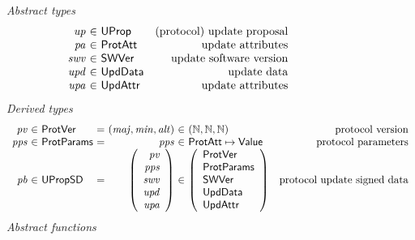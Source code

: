 \begin{figure}[htb]
  \emph{Abstract types}
  \begin{equation*}
    \begin{array}{r@{~\in~}lr}
      \var{up} & \UProp & \text{(protocol) update proposal}\\
      \var{pa} & \ProtAtt & \text{update attributes}\\
      \var{swv} & \type{SWVer} & \text{update software version}\\
      \var{upd} & \type{UpdData} & \text{update data}\\
      \var{upa} & \type{UpdAttr} & \text{update attributes}\\
    \end{array}
  \end{equation*}
  \emph{Derived types}
  \begin{equation*}
    \begin{array}{r@{~\in~}l@{~=~}r@{~\in~}lr}
      \var{pv} & \ProtVer & (\var{maj}, \var{min}, \var{alt})
      & (\mathbb{N}, \mathbb{N}, \mathbb{N}) & \text{protocol version}\\
      \var{pps} & \ProtParams & \var{pps} & \ProtAtt \mapsto \Value
                                             & \text{protocol parameters}\\
      \var{pb} & \UPropSD
      &
        {\left(\begin{array}{r l}
                 \var{pv}\\
                 \var{pps}\\
                 \var{swv}\\
                 \var{upd}\\
                 \var{upa}\\
               \end{array}\right)}
      & {
        \left(
        \begin{array}{l}
          \ProtVer\\
          \ProtParams\\
          \type{SWVer}\\
          \type{UpdData}\\
          \type{UpdAttr}\\
        \end{array}
                   \right)
                   }
                          & \text{protocol update signed data}
    \end{array}
  \end{equation*}
  \emph{Abstract functions}

\end{figure}
